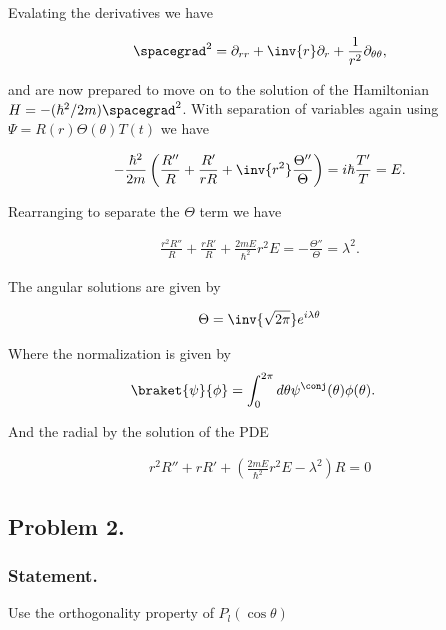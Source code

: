 Evalating the derivatives we have

\begin{align}\label{eqn:desaiCh4:150}
\spacegrad^2 = \partial_{rr} + \inv{r} \partial_r + \frac{1}{r^2} \partial_{\theta\theta},
\end{align}

and are now prepared to move on to the solution of the Hamiltonian $H = -(\hbar^2/2m) \spacegrad^2$.  With separation of variables again using $\Psi = R(r) \Theta(\theta) T(t)$ we have

\begin{align}\label{eqn:desaiCh4:151}
-\frac{\hbar^2}{2m} \left( \frac{R''}{R} + \frac{R'}{rR} + \inv{r^2} \frac{\Theta''}{\Theta} \right) = i \hbar \frac{T'}{T} = E.
\end{align}

Rearranging to separate the $\Theta$ term we have

\begin{align}\label{eqn:desaiCh4:152}
\frac{r^2 R''}{R} + \frac{r R'}{R} + \frac{2 m E}{\hbar^2} r^2 E = -\frac{\Theta''}{\Theta} = \lambda^2.
\end{align}

The angular solutions are given by 

\begin{align}\label{eqn:desaiCh4:153}
\Theta = \inv{\sqrt{2\pi}} e^{i \lambda \theta}
\end{align}

Where the normalization is given by 
\begin{align}\label{eqn:desaiCh4:160}
\braket{\psi}{\phi} &= 
\int_{0}^{2 \pi} d\theta \psi^\conj(\theta) \phi(\theta).
\end{align}

And the radial by the solution of the PDE

\begin{align}\label{eqn:desaiCh4:154}
r^2 R'' + r R' + \left( \frac{2 m E}{\hbar^2} r^2 E - \lambda^2 \right) R = 0
\end{align}

\subsection{Problem 2.}
\subsubsection{Statement.}

Use the orthogonality property of $P_l(\cos\theta)$

